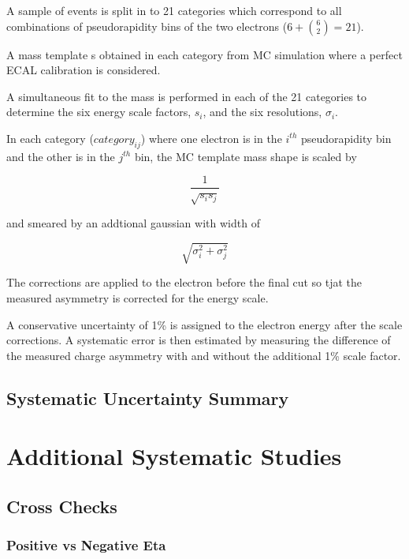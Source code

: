 A sample of \Zee events is  split in to 21 categories which correspond to all
combinations of pseudorapidity bins of the two electrons ($6+\binom{6}{2} = 21$).

A mass template s obtained in each category from \ac{MC} simulation where a
perfect \ac{ECAL} calibration is considered.

A simultaneous fit to the \Zee mass is performed in each of the 21 categories
to determine the six energy scale factors, $s_i$, and the six resolutions, 
$\sigma_i$.

In each category ($category_{ij}$) where one electron is in the $i^{th}$
pseudorapidity bin and the other is in the $j^{th}$ bin, the \ac{MC} template
mass shape is scaled by 

\begin{equation}
    \frac{1}{\sqrt{s_i s_j} } 
\end{equation}

and smeared by an addtional gaussian with width of 

\begin{equation}
    \sqrt{\sigma_i^2+\sigma_j^2}
\end{equation}


The corrections are applied to the electron before the final \Pt cut so tjat
the measured asymmetry is corrected for the energy scale.

A conservative uncertainty of \unit{1}{\% } is assigned to the electron energy
after the scale corrections. A systematic error is then estimated by measuring
the difference of the measured charge asymmetry with and without the additional
\unit{1}{\% } scale factor.


\subsection{Systematic Uncertainty Summary}

\section{Additional Systematic Studies}
\subsection{Cross Checks}
\subsubsection{Positive vs Negative Eta}
